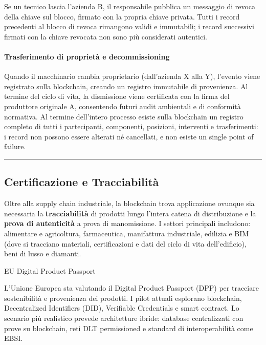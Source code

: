 \documentclass[
  italian,
  openany]{book}
\begin{document}
Se un tecnico lascia l'azienda B, il responsabile pubblica un messaggio
di revoca della chiave sul blocco, firmato con la propria chiave
privata. Tutti i record precedenti al blocco di revoca rimangono validi
e immutabili; i record successivi firmati con la chiave revocata non
sono più considerati autentici.

\paragraph{Trasferimento di proprietà e
decommissioning}\label{trasferimento-di-proprietuxe0-e-decommissioning}

Quando il macchinario cambia proprietario (dall'azienda X alla Y),
l'evento viene registrato sulla blockchain, creando un registro
immutabile di provenienza. Al termine del ciclo di vita, la dismissione
viene certificata con la firma del produttore originale A, consentendo
futuri audit ambientali e di conformità normativa. Al termine
dell'intero processo esiste sulla blockchain un registro completo di
tutti i partecipanti, componenti, posizioni, interventi e trasferimenti:
i record non possono essere alterati né cancellati, e non esiste un
single point of failure.

\begin{center}\rule{0.5\linewidth}{0.5pt}\end{center}

\subsection{Certificazione e
Tracciabilità}\label{certificazione-e-tracciabilituxe0}

Oltre alla supply chain industriale, la blockchain trova applicazione
ovunque sia necessaria la \textbf{tracciabilità} di prodotti lungo
l'intera catena di distribuzione e la \textbf{prova di autenticità} a
prova di manomissione. I settori principali includono: alimentare e
agricoltura, farmaceutica, manifattura industriale, edilizia e BIM (dove
si tracciano materiali, certificazioni e dati del ciclo di vita
dell'edificio), beni di lusso e diamanti.

\begin{calloutnote}{EU Digital Product Passport}

L'Unione Europea sta valutando il Digital Product Passport (DPP) per
tracciare sostenibilità e provenienza dei prodotti. I pilot attuali
esplorano blockchain, Decentralized Identifiers (DID), Verifiable
Credentials e smart contract. Lo scenario più realistico prevede
architetture ibride: database centralizzati con prove su blockchain,
reti DLT permissioned e standard di interoperabilità come EBSI.

\end{calloutnote}
\end{document}
